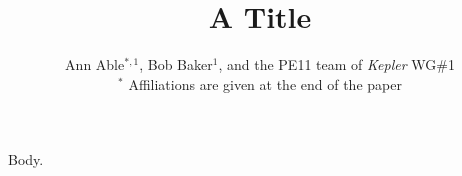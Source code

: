 \documentclass{article}
\begin{document}
\title{A Title}
\author{Ann Able$^{*,1}$, Bob Baker$^1$, and the PE11 team of {\it Kepler} WG\#1\\
{$^*$} Affiliations are given at the end of the paper}
\maketitle
Body.
\end{document}
